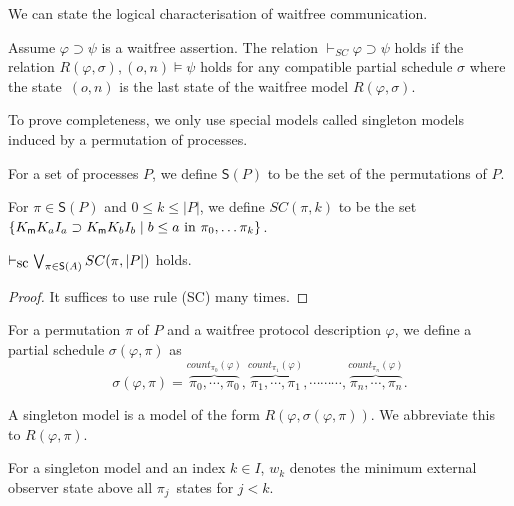   We can state the logical characterisation of waitfree communication.
  \begin{theorem}
   \label{wf:sc-comp}
   Assume $\varphi\supset \psi$ is a waitfree assertion.
   The relation $\vdash_{SC} \varphi\supset\psi$ holds if the relation $R(\varphi, \sigma),
   (o,n) \models \psi$ holds for any compatible partial schedule $\sigma$ where the state~$(o,n)$
   is the last state of the waitfree model $R(\varphi, \sigma)$.
  \end{theorem}
  To prove completeness, we only use special models called singleton
  models induced by a permutation of processes.

  \begin{definition}
   For a set of processes $P$, we define $\mathsf S(P)$ to be the set of the permutations of $P$.
  \end{definition}

  \begin{definition}
   For $\pi\in \mathsf S(P)$ and $0\le k\le |P|$, we define
   $SC(\pi,k)$ to be the set $\{K_{\sf m} K_a I_a\supset K_{\sf m} K_b I_b\mid b\le a\mbox{ in }\pi_0,\ldots \pi_k\}$.
  \end{definition}

  \begin{lemma}
   \label{perm}
   $\vdash_{\mbox{\rm sc}} \bigvee_{\pi\in \mathsf S(A)} SC(\pi, |P|)$ holds.
  \end{lemma}
  \begin{proof}
   It suffices to use rule (SC) many times.
  \end{proof}

  \begin{definition}
   For a permutation $\pi$ of $P$ and a waitfree protocol description $\varphi$, we
   define a partial schedule $\sigma(\varphi, \pi)$ as
   \[
   \sigma(\varphi, \pi) =
   \overbrace{\pi_0, \cdots, \pi_0}^{count_{\pi_0}(\varphi)},
   \overbrace{\pi_1, \cdots, \pi_1}^{count_{\pi_1}(\varphi)},
   \cdots \cdots
   \cdots,
   \overbrace{\pi_n,\cdots, \pi_n}^{count_{\pi_n}(\varphi)}.
   \]
  \end{definition}

  \begin{definition}
   A singleton model is a model of the form $R(\varphi, \sigma(\varphi,
   \pi))$. We abbreviate this to $R(\varphi, \pi)$.

   For a singleton model and an index $k\in I$, $w_k$ denotes the minimum external
   observer state above all $\pi_j$~states for $j< k$.
  \end{definition}

